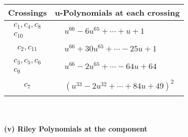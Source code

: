 \documentclass[1p]{elsarticle_modified}
\theoremstyle{definition}
\begin{document}
\begin{tabular}{m{50pt}|m{274pt}}
Crossings & \hspace{64pt}u-Polynomials at each crossing \\
\hline $$\begin{aligned}c_{1},c_{4},c_{8}\\c_{10}\end{aligned}$$&$\begin{aligned}
&u^{66}-6 u^{65}+\cdots+u+1
\end{aligned}$\\
\hline $$\begin{aligned}c_{2},c_{11}\end{aligned}$$&$\begin{aligned}
&u^{66}+30 u^{65}+\cdots-25 u+1
\end{aligned}$\\
\hline $$\begin{aligned}c_{3},c_{5},c_{6}\\c_{9}\end{aligned}$$&$\begin{aligned}
&u^{66}-2 u^{65}+\cdots-64 u+64
\end{aligned}$\\
\hline $$\begin{aligned}c_{7}\end{aligned}$$&$\begin{aligned}
&(u^{33}-2 u^{32}+\cdots+84 u+49)^{2}
\end{aligned}$\\
\hline
\end{tabular}\\~\\
\newpage\renewcommand{\arraystretch}{1}
\flushleft \textbf{(v) Riley Polynomials at the component}\newline \\
\end{document}
